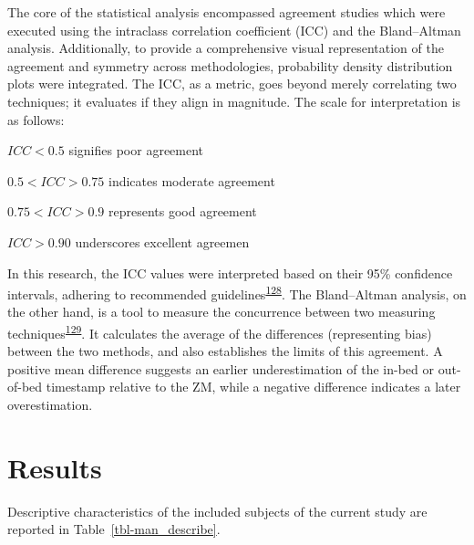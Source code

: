 \documentclass[
  10pt,
]{scrbook}
\begin{document}
The core of the statistical analysis encompassed agreement studies which
were executed using the intraclass correlation coefficient (ICC) and the
Bland--Altman analysis. Additionally, to provide a comprehensive visual
representation of the agreement and symmetry across methodologies,
probability density distribution plots were integrated. The ICC, as a
metric, goes beyond merely correlating two techniques; it evaluates if
they align in magnitude. The scale for interpretation is as follows:

\(ICC < 0.5\) signifies poor agreement

\(0.5 < ICC > 0.75\) indicates moderate agreement

\(0.75 < ICC > 0.9\) represents good agreement

\(ICC > 0.90\) underscores excellent agreemen

In this research, the ICC values were interpreted based on their 95\%
confidence intervals, adhering to recommended
guidelines\textsuperscript{\protect\hyperlink{ref-koo_guideline_2016}{128}}.
The Bland--Altman analysis, on the other hand, is a tool to measure the
concurrence between two measuring
techniques\textsuperscript{\protect\hyperlink{ref-bland_measuring_1999}{129}}.
It calculates the average of the differences (representing bias) between
the two methods, and also establishes the limits of this agreement. A
positive mean difference suggests an earlier underestimation of the
in-bed or out-of-bed timestamp relative to the ZM, while a negative
difference indicates a later overestimation.

\hypertarget{results}{%
\section{Results}\label{results}}

Descriptive characteristics of the included subjects of the current
study are reported in Table~\ref{tbl-man_describe}.

\begingroup

\footnotesize
\end{document}
